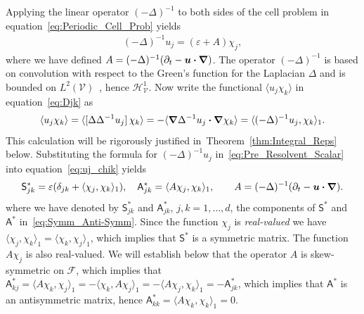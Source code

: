 \documentclass[leqno,onefignum,onetabnum]{siamltex1213}
\newcommand{\thmref}[1]{Theorem~\ref{#1}}
\newcommand{\Vc}{\mathcal{V}}
\newcommand{\Sm}{\mathsf{S}}
\newcommand{\Am}{\mathsf{A}}
\newcommand{\Hs}{\mathscr{H}}
\newcommand{\Fs}{\mathscr{F}}
\newcommand\bnabla{\mbox{\boldmath${\nabla}$}}
\providecommand\bcdot{\boldsymbol{\cdot}}
\newcommand{\vecu}{\boldsymbol{u}}
\begin{document}
Applying the linear operator $(-\Delta)^{-1}$ to both sides of the cell
problem in equation~\eqref{eq:Periodic_Cell_Prob} yields
%
\begin{align}\label{eq:Pre_Resolvent_Scalar}
  (-\Delta)^{-1}u_j=(\varepsilon+A)\chi_j,
\end{align}
%
where we have defined $A=(-\Delta)^{-1}(\partial_t-\vecu \bcdot\bnabla)$. The
operator $(-\Delta)^{-1}$ is based on convolution with respect to
the Green's function for the Laplacian $\Delta$ and is bounded on  
$L^2(\Vc)$~\cite{Stakgold:BVP:2000}, hence $\Hs^1_{\Vc}$. Now write
the functional $\langle u_j\chi_k\rangle$ in equation~\eqref{eq:Djk}
as~\cite{Pavliotis:PHD_Thesis}    
%
\begin{align}\label{eq:uj_chik}
  \langle u_j\chi_k\rangle=\langle[\Delta\Delta^{-1}u_j]\,\chi_k\rangle
       =-\langle\bnabla \Delta^{-1}u_j\bcdot\bnabla \chi_k\rangle
       =\langle(-\Delta)^{-1}u_j,\chi_k\rangle_1.
\end{align}
%
This calculation will be rigorously justified
in~\thmref{thm:Integral_Reps} below. Substituting the 
formula for $(-\Delta)^{-1}u_j$ in~\eqref{eq:Pre_Resolvent_Scalar} into
equation~\eqref{eq:uj_chik} yields  
%
\begin{align}\label{eq:Eff_Diffusivity_Sobolev}
  \Sm^*_{jk}=\varepsilon(\delta_{jk}+\langle\chi_j,\chi_k\rangle_1),
  \quad
  \Am^*_{jk}=\langle A\chi_j,\chi_k\rangle_1,
  \qquad
  A=(-\Delta)^{-1}(\partial_t-\vecu \bcdot\bnabla)
  .
\end{align}
%
where we have denoted by $\Sm^*_{jk}$ and $\Am^*_{jk}$, $j,k=1,\ldots,d$,
the components of $\Sm^*$ and $\Am^*$
in~\eqref{eq:Symm_Anti-Symm}. Since the function $\chi_j$ is
\emph{real-valued} we have $\langle\chi_j,\chi_k\rangle_1=\langle\chi_k,\chi_j\rangle_1$, which implies that
$\Sm^*$ is a symmetric matrix. The function $A\chi_j$ is also
real-valued. We will establish below that the operator $A$ is
skew-symmetric on $\Fs$, which implies that
$\Am^*_{kj}=\langle A\chi_k,\chi_j\rangle_1=-\langle\chi_k,A\chi_j\rangle_1=-\langle A\chi_j,\chi_k\rangle_1=-\Am^*_{jk}$, which implies
that $\Am^*$ is an antisymmetric matrix, hence $\Am^*_{kk}=\langle A\chi_k,\chi_k\rangle_1=0$.
\end{document}
